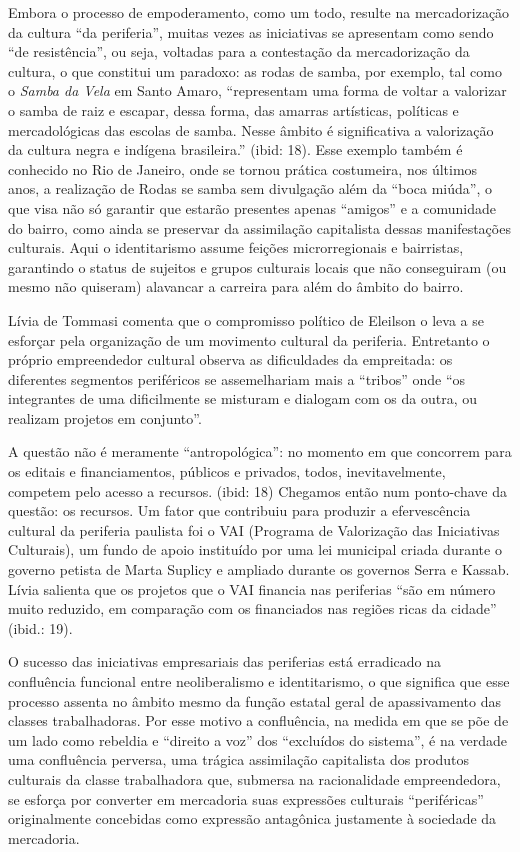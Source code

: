 Embora o processo de empoderamento, como um todo, resulte na
mercadorização da cultura ``da periferia'', muitas vezes as iniciativas
se apresentam como sendo ``de resistência'', ou seja, voltadas para a
contestação da mercadorização da cultura, o que constitui um paradoxo:
as rodas de samba, por exemplo, tal como o \emph{Samba da Vela} em Santo
Amaro, ``representam uma forma de voltar a valorizar o samba de raiz e
escapar, dessa forma, das amarras artísticas, políticas e mercadológicas
das escolas de samba. Nesse âmbito é significativa a valorização da
cultura negra e indígena brasileira.'' (ibid: 18). Esse exemplo também é
conhecido no Rio de Janeiro, onde se tornou prática costumeira, nos
últimos anos, a realização de Rodas se samba sem divulgação além da
``boca miúda'', o que visa não só garantir que estarão presentes apenas
``amigos'' e a comunidade do bairro, como ainda se preservar da
assimilação capitalista dessas manifestações culturais. Aqui o
identitarismo assume feições microrregionais e bairristas, garantindo o
status de sujeitos e grupos culturais locais que não conseguiram (ou
mesmo não quiseram) alavancar a carreira para além do âmbito do bairro.

Lívia de Tommasi comenta que o compromisso político de Eleilson o leva a
se esforçar pela organização de um movimento cultural da periferia.
Entretanto o próprio empreendedor cultural observa as dificuldades da
empreitada: os diferentes segmentos periféricos se assemelhariam mais a
``tribos'' onde ``os integrantes de uma dificilmente se misturam e
dialogam com os da outra, ou realizam projetos em conjunto''.

A questão não é meramente ``antropológica'': no momento em que concorrem
para os editais e financiamentos, públicos e privados, todos,
inevitavelmente, competem pelo acesso a recursos. (ibid: 18) Chegamos
então num ponto-chave da questão: os recursos. Um fator que contribuiu
para produzir a efervescência cultural da periferia paulista foi o VAI
(Programa de Valorização das Iniciativas Culturais), um fundo de apoio
instituído por uma lei municipal criada durante o governo petista de
Marta Suplicy e ampliado durante os governos Serra e Kassab. Lívia
salienta que os projetos que o VAI financia nas periferias ``são em
número muito reduzido, em comparação com os financiados nas regiões
ricas da cidade'' (ibid.: 19).

O sucesso das iniciativas empresariais das periferias está erradicado na
confluência funcional entre neoliberalismo e identitarismo, o que
significa que esse processo assenta no âmbito mesmo da função estatal
geral de apassivamento das classes trabalhadoras. Por esse motivo a
confluência, na medida em que se põe de um lado como rebeldia e
``direito a voz'' dos ``excluídos do sistema'', é na verdade uma
confluência perversa, uma trágica assimilação capitalista dos produtos
culturais da classe trabalhadora que, submersa na racionalidade
empreendedora, se esforça por converter em mercadoria suas expressões
culturais ``periféricas'' originalmente concebidas como expressão
antagônica justamente à sociedade da mercadoria.

